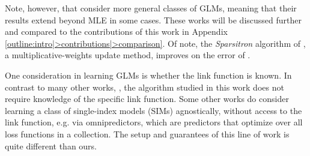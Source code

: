 Note, however, that \cite{kakade2011efficient,bahmani2016learning} consider more general classes of GLMs, %
meaning that their results extend beyond MLE in some cases.
These works will be discussed further and compared to the contributions of this work in Appendix \ref{outline:intro|>contributions|>comparison}.
Of note, the \emph{Sparsitron} algorithm of \cite{klivans2017learning}, a multiplicative-weights update method, improves on the error of \GLMtron. %

One consideration in learning GLMs is whether the link function is known.
In contrast to many other works, \eg \cite{nelder1972generalized,kakade2011efficient,bahmani2016learning,barbier2019optimal,plan2016generalized,thrampoulidis2015lasso}, the algorithm studied in this work does not require knowledge of the specific link function. %
Some other works do consider learning a class of single-index models (SIMs) agnostically, without access to the link function, 
e.g. \cite{gollakota2024agnostically} via omnipredictors,  which are predictors that optimize over all loss functions in a collection. The setup and guarantees of this line of work is quite different than ours.


